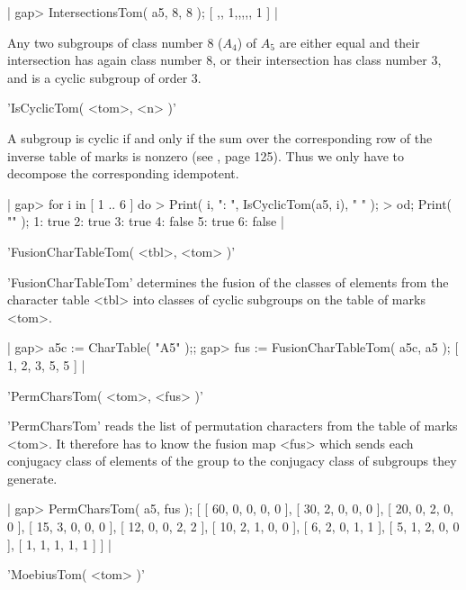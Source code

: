 |    gap> IntersectionsTom( a5, 8, 8 );
    [ ,, 1,,,,, 1 ] |

Any two subgroups of class number 8 ($A_4$) of $A_5$ are either equal and
their intersection has again  class number  8, or their intersection  has
class number $3$, and is a cyclic subgroup of order 3.


'IsCyclicTom( <tom>, <n> )'

A subgroup is cyclic if and only if the sum over the corresponding row of
the inverse table of marks is nonzero (see \cite{Ker91}, page 125).  Thus
we only have to decompose the corresponding idempotent.

|    gap> for i in [ 1 .. 6 ] do                       
    > Print( i, ": ", IsCyclicTom(a5, i), "  " );
    > od;  Print( "\n" );
    1: true  2: true  3: true  4: false  5: true  6: false   |


'FusionCharTableTom( <tbl>, <tom> )'

'FusionCharTableTom' determines  the fusion of the  classes  of  elements
from  the  character table <tbl> into classes of cyclic subgroups  on the
table of marks <tom>.

|    gap> a5c := CharTable( "A5" );;
    gap> fus := FusionCharTableTom( a5c, a5 );
    [ 1, 2, 3, 5, 5 ] |


'PermCharsTom( <tom>, <fus> )'

'PermCharsTom' reads the list of permutation characters from the table of
marks <tom>.  It therefore has to  know  the fusion map <fus> which sends
each conjugacy  class of elements  of the group to the conjugacy class of
subgroups  they generate.

|    gap> PermCharsTom( a5, fus );
    [ [ 60, 0, 0, 0, 0 ], [ 30, 2, 0, 0, 0 ], [ 20, 0, 2, 0, 0 ], 
      [ 15, 3, 0, 0, 0 ], [ 12, 0, 0, 2, 2 ], [ 10, 2, 1, 0, 0 ], 
      [ 6, 2, 0, 1, 1 ], [ 5, 1, 2, 0, 0 ], [ 1, 1, 1, 1, 1 ] ] |


'MoebiusTom( <tom> )'

